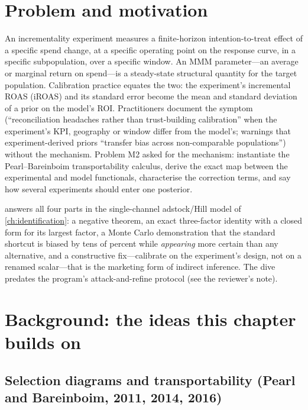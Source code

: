 \section{Problem and motivation}

An incrementality experiment measures a finite-horizon intention-to-treat effect of a specific spend change, at a specific operating point on the response curve, in a specific subpopulation, over a specific window. An MMM parameter---an average or marginal return on spend---is a steady-state structural quantity for the target population. Calibration practice equates the two: the experiment's incremental ROAS (iROAS) and its standard error become the mean and standard deviation of a prior on the model's ROI. Practitioners document the symptom (``reconciliation headaches rather than trust-building calibration'' when the experiment's KPI, geography or window differ from the model's; warnings that experiment-derived priors ``transfer bias across non-comparable populations'') without the mechanism. Problem M2 asked for the mechanism: instantiate the Pearl--Bareinboim transportability calculus, derive the exact map between the experimental and model functionals, characterise the correction terms, and say how several experiments should enter one posterior.

 answers all four parts in the single-channel adstock/Hill model of \cref{ch:identification}: a negative theorem, an exact three-factor identity with a closed form for its largest factor, a Monte Carlo demonstration that the standard shortcut is biased by tens of percent while \emph{appearing} more certain than any alternative, and a constructive fix---calibrate on the experiment's design, not on a renamed scalar---that is the marketing form of indirect inference. The dive predates the program's attack-and-refine protocol (see the reviewer's note).

\section{Background: the ideas this chapter builds on}

\subsection{Selection diagrams and transportability (Pearl and Bareinboim, 2011, 2014, 2016)}

